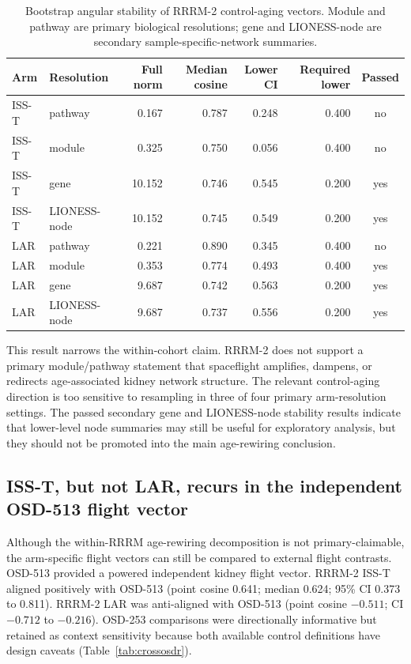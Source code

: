 \documentclass[11pt]{article}
\begin{document}
\begin{table}[h]
\centering\small
\begin{tabular}{llrrrrc}
\toprule
Arm & Resolution & Full norm & Median cosine & Lower CI & Required lower & Passed \\
\midrule
ISS-T & pathway & 0.167 & 0.787 & 0.248 & 0.400 & no \\
ISS-T & module & 0.325 & 0.750 & 0.056 & 0.400 & no \\
ISS-T & gene & 10.152 & 0.746 & 0.545 & 0.200 & yes \\
ISS-T & LIONESS-node & 10.152 & 0.745 & 0.549 & 0.200 & yes \\
LAR & pathway & 0.221 & 0.890 & 0.345 & 0.400 & no \\
LAR & module & 0.353 & 0.774 & 0.493 & 0.400 & yes \\
LAR & gene & 9.687 & 0.742 & 0.563 & 0.200 & yes \\
LAR & LIONESS-node & 9.687 & 0.737 & 0.556 & 0.200 & yes \\
\bottomrule
\end{tabular}
\caption{Bootstrap angular stability of RRRM-2 control-aging vectors. Module and pathway are primary biological resolutions; gene and LIONESS-node are secondary sample-specific-network summaries.}
\label{tab:stability}
\end{table}

This result narrows the within-cohort claim. RRRM-2 does not support a primary module/pathway statement that spaceflight amplifies, dampens, or redirects age-associated kidney network structure. The relevant control-aging direction is too sensitive to resampling in three of four primary arm-resolution settings. The passed secondary gene and LIONESS-node stability results indicate that lower-level node summaries may still be useful for exploratory analysis, but they should not be promoted into the main age-rewiring conclusion.

\subsection{ISS-T, but not LAR, recurs in the independent OSD-513 flight vector}

Although the within-RRRM age-rewiring decomposition is not primary-claimable, the arm-specific flight vectors can still be compared to external flight contrasts. OSD-513 provided a powered independent kidney flight vector. RRRM-2 ISS-T aligned positively with OSD-513 (point cosine 0.641; median 0.624; 95\% CI 0.373 to 0.811). RRRM-2 LAR was anti-aligned with OSD-513 (point cosine $-0.511$; CI $-0.712$ to $-0.216$). OSD-253 comparisons were directionally informative but retained as context sensitivity because both available control definitions have design caveats (Table~\ref{tab:crossosdr}).
\end{document}

